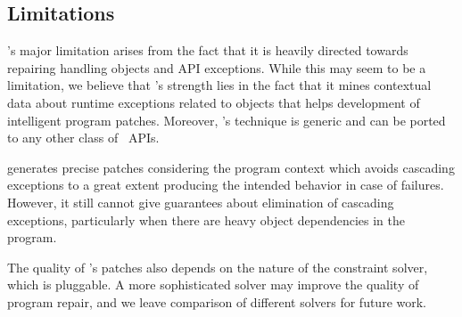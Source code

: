 
\subsection{Limitations}
\label{sec:tool:limitation}

\tool's major limitation arises from the fact that it is heavily directed
towards repairing handling  objects and API exceptions. While this
may seem to be a limitation, we believe that \tool's strength lies in the fact
that it mines contextual data about runtime exceptions related to 
objects that helps development of intelligent program patches. Moreover, \tool's
technique is generic and can be ported to any other class of \java\ APIs.

\tool generates precise patches considering the program context which avoids
cascading exceptions to a great extent producing the intended behavior in case
of failures. However, it still cannot give guarantees about elimination of cascading
exceptions, particularly when there are heavy object dependencies in the program.

The quality of \tool's patches also depends on the nature of the constraint
solver, which is pluggable. A more sophisticated solver may improve the quality
of program repair, and we leave comparison of different solvers for future work.

